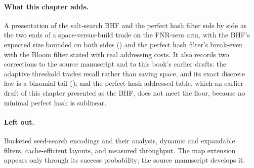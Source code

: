 \paragraph{What this chapter adds.}
A presentation of the salt-search BHF and the perfect hash filter side
by side as the two ends of a space-versus-build trade on the FNR-zero
arm, with the BHF's expected size bounded on both sides
() and the perfect hash filter's break-even with
the Bloom filter stated with real addressing costs. It also records two
corrections to the source manuscript and to this book's earlier drafts:
the adaptive threshold trades recall rather than saving space, and its
exact discrete law is a binomial tail ();
and the perfect-hash-addressed table, which an earlier draft of this
chapter presented as the BHF, does not meet the floor, because no minimal
perfect hash is sublinear.

\paragraph{Left out.}
Bucketed seed-search encodings and their analysis, dynamic and
expandable filters, cache-efficient layouts, and measured throughput.
The map extension appears only through its success probability; the
source manuscript develops it.
